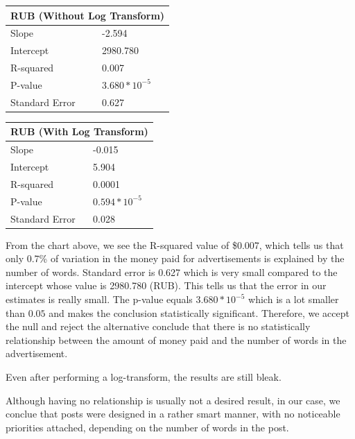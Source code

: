 \documentclass[12pt]{article}
\theoremstyle{definition}
\begin{document}
\bigskip

\begin{center}
\begin{tabular}{|p{3cm}|p{3cm}|}
 \hline
 \multicolumn{2}{|c|}{RUB (Without Log Transform)}\\
 \hline
 Slope          & -2.594\\
 \hline
 Intercept      & 2980.780\\
 \hline
 R-squared      & 0.007\\
 \hline
 P-value        & $3.680 * 10^{-5}$\\
 \hline
 Standard Error & 0.627\\
 \hline
\end{tabular}
\qquad
\begin{tabular}{|p{3cm}|p{3cm}|}
 \hline
 \multicolumn{2}{|c|}{RUB (With Log Transform)}\\
 \hline
 Slope          & -0.015\\
 \hline
 Intercept      & 5.904\\
 \hline
 R-squared      & 0.0001\\
 \hline
 P-value        & $0.594 * 10^{-5}$\\
 \hline
 Standard Error & 0.028\\
 \hline
\end{tabular}
\end{center}

\bigskip

From the chart above, we see the R-squared value of \$0.007, which tells us
that only 0.7\% of variation in the money paid for advertisements is explained
by the number of words. Standard error is 0.627 which is very small compared
to the intercept whose value is 2980.780 (RUB). This tells us that the error
in our estimates is really small. The p-value equals $3.680 * 10^{-5}$ which
is a lot smaller than $0.05$ and makes the conclusion statistically significant.
Therefore, we accept the null and reject the alternative conclude that there
is no statistically relationship between the amount of money paid and the
number of words in the advertisement.

\bigskip

Even after performing a log-transform, the results are still bleak.

\bigskip

Although having no relationship is usually not a desired result, in our case,
we conclue that posts were designed in a rather smart manner, with no
noticeable priorities attached, depending on the number of words in the post.
\end{document}
